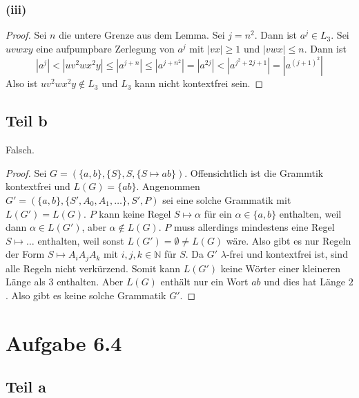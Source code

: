 \documentclass[10pt,a4paper]{article}
\begin{document}
\subsubsection{(iii)}

\begin{proof}
  Sei $n$ die untere Grenze aus dem Lemma.
  Sei $j = n^{2}$.
  Dann ist $a^{j} \in L_{3}$.
  Sei $uvwxy$ eine aufpumpbare Zerlegung von $a^{j}$ mit $|vx| \ge 1$ und $|vwx| \le n$.
  Dann ist
  \begin{equation}
    |a^{j}| < |uv^{2}wx^{2}y| \le |a^{j + n}| \le |a^{j + n^{2}}| = |a^{2j}| < |a^{j^{2} + 2j + 1}| = |a^{(j + 1)^{2}}|
  \end{equation}
  Also ist $uv^{2}wx^{2}y \not\in L_{3}$ und $L_{3}$ kann nicht kontextfrei sein.
\end{proof}

\subsection{Teil b}

Falsch.

\begin{proof}
  Sei $G = (\{ a, b \}, \{ S \}, S, \{ S \mapsto ab \})$.
  Offensichtlich ist die Grammtik kontextfrei und $L(G) = \{ ab \}$.
  Angenommen $G' = (\{ a, b \}, \{ S', A_{0}, A_{1}, \dots \}, S', P)$ sei eine solche Grammatik mit $L(G') = L(G)$.
  $P$ kann keine Regel $S \mapsto \alpha$ für ein $\alpha \in \{ a, b \}$ enthalten, weil dann $\alpha \in L(G')$, aber $\alpha \not\in L(G)$.
  $P$ muss allerdings mindestens eine Regel $S \mapsto \dots$ enthalten, weil sonst $L(G') = \emptyset \ne L(G)$ wäre.
  Also gibt es nur Regeln der Form $S \mapsto A_{i}A_{j}A_{k}$ mit $i, j, k \in \mathbb{N}$ für $S$.
  Da $G'$ $\lambda$-frei und kontextfrei ist, sind alle Regeln nicht verkürzend.
  Somit kann $L(G')$ keine Wörter einer kleineren Länge als $3$ enthalten.
  Aber $L(G)$ enthält nur ein Wort $ab$ und dies hat Länge $2$.
  Also gibt es keine solche Grammatik $G'$.
\end{proof}

\section{Aufgabe 6.4}

\subsection{Teil a}
\end{document}
